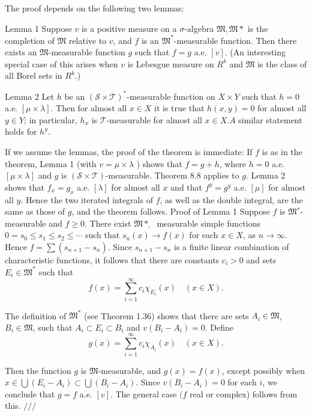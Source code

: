 The proof depends on the following two lemmas:

Lemma 1 Suppose $v$ is a positive measure on a $\sigma$-algebra $\mathfrak{M}, \mathfrak{M} *$ is the completion of $\mathfrak{M}$ relative to $v$, and $f$ is an $\mathfrak{M}^*$-measurable function. Then there exists an $\mathfrak{M}$-measurable function $g$ such that $f=g$ a.e. $[v]$.
(An interesting special case of this arises when $v$ is Lebesgue measure on $R^k$ and $\mathfrak{M}$ is the class of all Borel sets in $R^k$.)

Lemma 2 Let $h$ be an $(\mathscr{S} \times \mathscr{T})^*$-measurable function on $X \times Y$ such that $h=0$ a.e. $[\mu \times \lambda]$. Then for almost all $x \in X$ it is true that $h(x, y)=0$ for almost all $y \in Y$; in particular, $h_x$ is $\mathscr{T}$-measurable for almost all $x \in X . A$ similar statement holds for $h^y$.

If we assume the lemmas, the proof of the theorem is immediate: If $f$ is as in the theorem, Lemma 1 (with $v=\mu \times \lambda$ ) shows that $f=g+h$, where $h=0$ a.e. $[\mu \times \lambda]$ and $g$ is $(\mathscr{S} \times \mathscr{T})$-measurable. Theorem 8.8 applies to $g$. Lemma 2 shows that $f_x=g_x$ a.e. $[\lambda]$ for almost all $x$ and that $f^y=g^y$ a.e. $[\mu]$ for almost all $y$. Hence the two iterated integrals of $f$, as well as the double integral, are the same as those of $g$, and the theorem follows.
Proof of Lemma 1 Suppose $f$ is $\mathfrak{M}{ }^*$-measurable and $f \geq 0$. There exist $\mathfrak{M} *_{\text {- }}$ measurable simple functions $0=s_0 \leq s_1 \leq s_2 \leq \cdots$ such that $s_n(x) \rightarrow f(x)$ for each $x \in X$, as $n \rightarrow \infty$. Hence $f=\sum\left(s_{n+1}-s_n\right)$. Since $s_{n+1}-s_n$ is a finite linear combination of characteristic functions, it follows that there are constants $c_i>0$ and sets $E_i \in \mathfrak{M}^*$ such that
$$
f(x)=\sum_{i=1}^{\infty} c_i \chi_{E_i}(x) \quad(x \in X) .
$$

The definition of $\mathfrak{M}^*$ (see Theorem 1.36) shows that there are sets $A_i \in \mathfrak{M}$, $B_i \in \mathfrak{M}$, such that $A_i \subset E_i \subset B_i$ and $v\left(B_i-A_i\right)=0$. Define
$$
g(x)=\sum_{i=1}^{\infty} c_i \chi_{A_i}(x) \quad(x \in X) .
$$

Then the function $g$ is $\mathfrak{M}$-measurable, and $g(x)=f(x)$, except possibly when $x \in \bigcup\left(E_i-A_i\right) \subset \bigcup\left(B_i-A_i\right)$. Since $v\left(B_i-A_i\right)=0$ for each $i$, we conclude that $g=f$ a.e. $[v]$. The general case $(f$ real or complex) follows from this. $/ / /$

